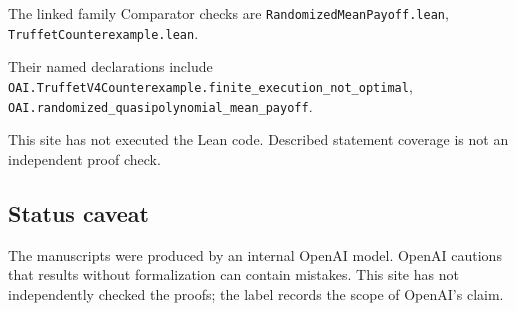 \documentclass[11pt]{article}
\begin{document}
The linked family Comparator checks are \texttt{RandomizedMeanPayoff.lean}, \texttt{TruffetCounterexample.lean}.

Their named declarations include \texttt{OAI.TruffetV4Counterexample.finite\_execution\_not\_optimal}, \texttt{OAI.randomized\_quasipolynomial\_mean\_payoff}.

This site has not executed the Lean code. Described statement coverage is not an independent proof check.

\subsection{Status caveat}
The manuscripts were produced by an internal OpenAI model. OpenAI cautions that results without formalization can contain mistakes. This site has not independently checked the proofs; the label records the scope of OpenAI's claim.
\end{document}
